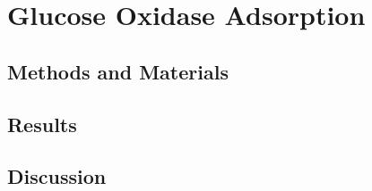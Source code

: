 
\chapter{Glucose Oxidase Adsorption}


\section*{Methods and Materials}


\section*{Results}


\section*{Discussion}
